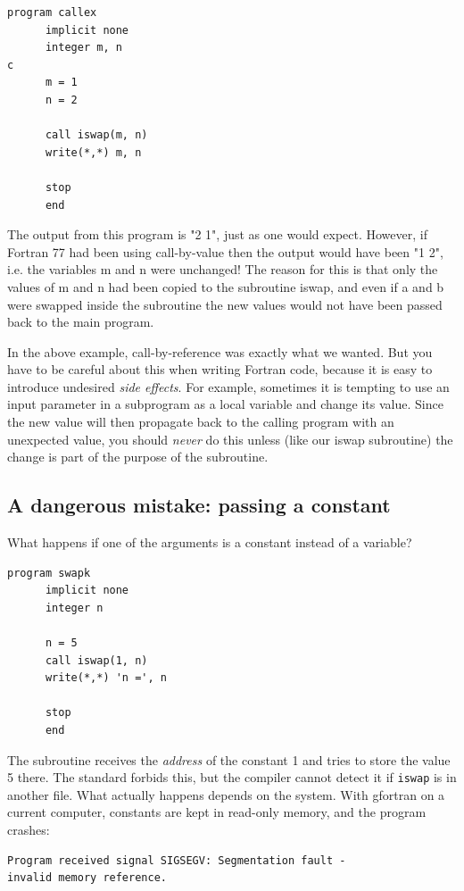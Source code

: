 \begin{lstlisting}[style=fortran77]
      program callex
      implicit none
      integer m, n
c
      m = 1
      n = 2 

      call iswap(m, n)
      write(*,*) m, n

      stop
      end
\end{lstlisting}

The output from this program is "2 1", just as one would expect. However, if Fortran 77 had been using call-by-value then the output would have been "1 2", i.e. the variables m and n were unchanged! The reason for this is that only the values of m and n had been copied to the subroutine iswap, and even if a and b were swapped inside the subroutine the new values would not have been passed back to the main program.

In the above example, call-by-reference was exactly what we wanted. But you have to be careful about this when writing Fortran code, because it is easy to introduce undesired \emph{side effects}. For example, sometimes it is tempting to use an input parameter in a subprogram as a local variable and change its value. Since the new value will then propagate back to the calling program with an unexpected value, you should \emph{never} do this unless (like our iswap subroutine) the change is part of the purpose of the subroutine.

\subsection{A dangerous mistake: passing a constant}

What happens if one of the arguments is a constant instead of a variable?

\begin{lstlisting}[style=fortran77]
      program swapk
      implicit none
      integer n

      n = 5
      call iswap(1, n)
      write(*,*) 'n =', n

      stop
      end
\end{lstlisting}

The subroutine receives the \emph{address} of the constant 1 and tries to store the value 5 there. The standard forbids this, but the compiler cannot detect it if \texttt{iswap} is in another file. What actually happens depends on the system. With gfortran on a current computer, constants are kept in read-only memory, and the program crashes:

\begin{lstlisting}[style=output]
Program received signal SIGSEGV: Segmentation fault -
invalid memory reference.
\end{lstlisting}

